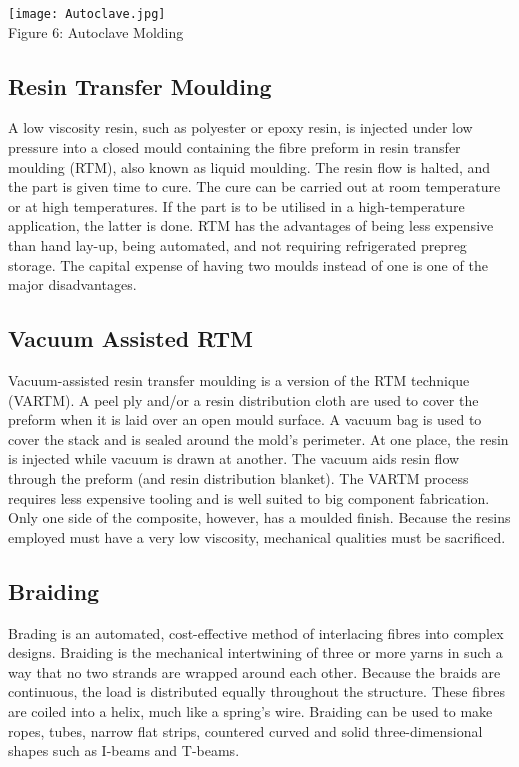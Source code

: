 \documentclass{article}
\begin{document}
\begin{multicols}{2}
\begin{center}
\texttt{[image: Autoclave.jpg]}\\

{\small Figure 6: Autoclave Molding}
\end{center}

\subsection{Resin Transfer Moulding}

A low viscosity resin, such as polyester or epoxy resin, is injected under low pressure into a closed mould containing the fibre preform in resin transfer moulding (RTM), also known as liquid moulding. The resin flow is halted, and the part is given time to cure. The cure can be carried out at room temperature or at high temperatures. If the part is to be utilised in a high-temperature application, the latter is done. RTM has the advantages of being less expensive than hand lay-up, being automated, and not requiring refrigerated prepreg storage. The capital expense of having two moulds instead of one is one of the major disadvantages.

\subsection{Vacuum Assisted RTM}

Vacuum-assisted resin transfer moulding is a version of the RTM technique (VARTM). A peel ply and/or a resin distribution cloth are used to cover the preform when it is laid over an open mould surface. A vacuum bag is used to cover the stack and is sealed around the mold's perimeter. At one place, the resin is injected while vacuum is drawn at another. The vacuum aids resin flow through the preform (and resin distribution blanket). The VARTM process requires less expensive tooling and is well suited to big component fabrication. Only one side of the composite, however, has a moulded finish. Because the resins employed must have a very low viscosity, mechanical qualities must be sacrificed.

\subsection{Braiding}

Brading is an automated, cost-effective method of interlacing fibres into complex designs. Braiding is the mechanical intertwining of three or more yarns in such a way that no two strands are wrapped around each other. Because the braids are continuous, the load is distributed equally throughout the structure. These fibres are coiled into a helix, much like a spring's wire. Braiding can be used to make ropes, tubes, narrow flat strips, countered curved and solid three-dimensional shapes such as I-beams and T-beams.


\end{multicols}
\end{document}
